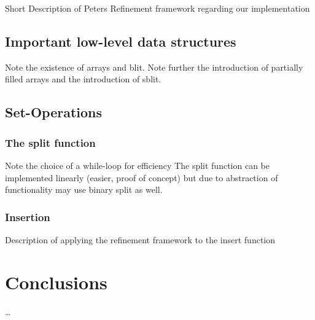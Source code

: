 Short Description of Peters Refinement framework regarding our implementation

\section{Important low-level data structures}

Note the existence of arrays and blit.
Note further the introduction of partially filled arrays
and the introduction of sblit.

\section{Set-Operations}

\subsection{The split function}

Note the choice of a while-loop for efficiency
The split function can be implemented linearly (easier, proof of concept)
but due to abstraction of functionality may use binary split as well.

\subsection{Insertion}

Description of applying the refinement framework to the insert function

\chapter{Conclusions}

\dots